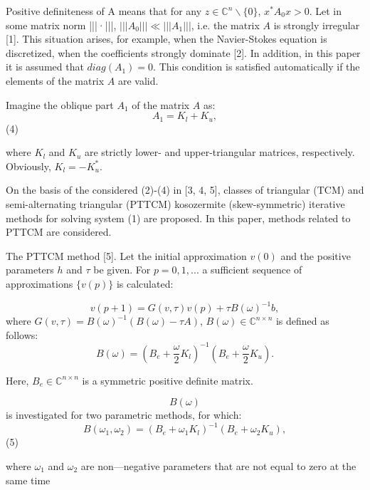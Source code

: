 \documentclass{article}
\begin{document}
Positive definiteness of A means that for any \(z\in\mathbb{C}^n\backslash \{0\} \), \( x^*A_0x > 0 \). Let in some matrix norm |||·|||, \( ||| A_0|||\ll|||A_1|||\), i.e. the matrix \(A\) is strongly irregular [1]. This situation arises, for example, when the Navier-Stokes equation is discretized, when the coefficients strongly dominate [2]. In addition, in this paper it is assumed that \(diag(A_1) = 0\). This condition is satisfied automatically if the elements of the matrix \(A\) are valid.

Imagine the oblique part \(A_1\) of the matrix \(A\) as:
\[ A_1 = K_l + K_u, \] (4)

where \(K_l\) and \(K_u\) are strictly lower- and upper-triangular matrices, respectively. Obviously, \(K_l = -K^*_u\).

On the basis of the considered (2)-(4) in [3, 4, 5], classes of triangular (TCM) and semi-alternating triangular (PTTCM) kosozermite (skew-symmetric) iterative methods for solving system (1) are proposed. In this paper, methods related to PTTCM are considered.

The PTTCM method [5]. Let the initial approximation \(v(0)\) and the positive parameters \(h\) and \(\tau\) be given. For \(p = 0,1, ... \) a sufficient sequence of approximations \( \{v(p)\} \) is calculated:

\[ v(p+1) = G(v, \tau)v(p) + \tau B(\omega)^{-1}b, \]
where \(G(v, \tau) = B(\omega)^{-1}(B(\omega) - \tau A) \), \(B(\omega)\in\mathbb{C}^{n\times n}\) is defined as follows:
\[B(\omega) = (B_e + \frac{\omega}{2} K_l)^{-1}(B_e + \frac{\omega}{2}K_u). \]

Here, \(B_e\in \mathbb{C}^{n\times n}\) is a symmetric positive definite matrix.

\[B(\omega) \] is investigated for two parametric methods, for which:
\[B(\omega_1, \omega_2) = (B_e +\omega_1 K_l)^{-1}(B_e+\omega_2 K_u), \](5)

where \(\omega_1\) and \( \omega_2\) are non—negative parameters that are not equal to zero at the same time
\end{document}
